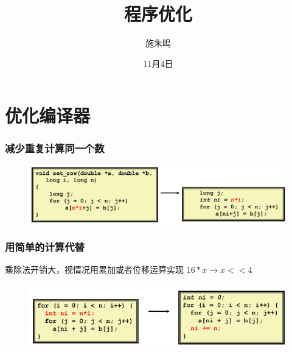 \documentclass[12pt,AutoFakeBold,aspectratio=169,mathserif]{beamer}
\title{程序优化}
\author{施朱鸣}
\date{11月4日}
\begin{document}
    {
    
    \begin{frame}
    \titlepage
    \end{frame}

    \section{优化编译器}
    \begin{frame}
        \frametitle{减少重复计算同一个数}
    
        \begin{figure}
            \includegraphics[width=\textwidth]{figures/1.png}
        \end{figure}
    
    \end{frame}

    \begin{frame}
        \frametitle{用简单的计算代替}
    
        乘除法开销大，视情况用累加或者位移运算实现
        \(16*x\rightarrow x<<4\)
        \begin{figure}
            \includegraphics[width=\textwidth]{figures/2.png}
        \end{figure}
    

\end{frame}}
\end{document}
